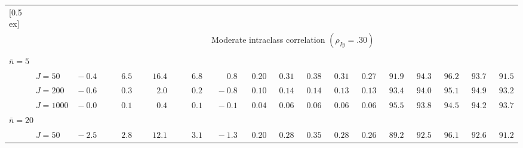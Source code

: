 \begin{sidewaystable}
\begin{threeparttable}
\begin{tabular}{llccccccccccccccc}
[0.5ex]\hline\\[-1.6ex] 
& & \multicolumn{15}{c}{Moderate intraclass correlation $(\rho_{Iy}=.30)$} \\[0.6ex]\hline\\[-1.8ex]
\multicolumn{4}{l}{$\bar{n}=5$} \\  & \nopagebreak $\;J=50$  & $\phantom{0}{-}0.4\phantom{0}$ & $\phantom{0}\phantom{-}6.5\phantom{0}$ & $\phantom{-}16.4\phantom{0}$ & $\phantom{0}\phantom{-}6.8\phantom{0}$ & $\phantom{0}\phantom{-}0.8\phantom{0}$ & $\phantom{0}0.20\phantom{0}$ & $\phantom{0}0.31\phantom{0}$ & $\phantom{0}0.38\phantom{0}$ & $\phantom{0}0.31\phantom{0}$ & $\phantom{0}0.27\phantom{0}$ & $\phantom{0}91.9\phantom{0}$ & $\phantom{0}94.3\phantom{0}$ & $\phantom{0}96.2\phantom{0}$ & $\phantom{0}93.7\phantom{0}$ & $\phantom{0}91.5\phantom{0}$ \\
 & \nopagebreak $\;J=200$  & $\phantom{0}{-}0.6\phantom{0}$ & $\phantom{0}\phantom{-}0.3\phantom{0}$ & $\phantom{0}\phantom{-}2.0\phantom{0}$ & $\phantom{0}\phantom{-}0.2\phantom{0}$ & $\phantom{0}{-}0.8\phantom{0}$ & $\phantom{0}0.10\phantom{0}$ & $\phantom{0}0.14\phantom{0}$ & $\phantom{0}0.14\phantom{0}$ & $\phantom{0}0.13\phantom{0}$ & $\phantom{0}0.13\phantom{0}$ & $\phantom{0}93.4\phantom{0}$ & $\phantom{0}94.0\phantom{0}$ & $\phantom{0}95.1\phantom{0}$ & $\phantom{0}94.9\phantom{0}$ & $\phantom{0}93.2\phantom{0}$ \\
 & \nopagebreak $\;J=1000$  & $\phantom{0}{-}0.0\phantom{0}$ & $\phantom{0}\phantom{-}0.1\phantom{0}$ & $\phantom{0}\phantom{-}0.4\phantom{0}$ & $\phantom{0}\phantom{-}0.1\phantom{0}$ & $\phantom{0}{-}0.1\phantom{0}$ & $\phantom{0}0.04\phantom{0}$ & $\phantom{0}0.06\phantom{0}$ & $\phantom{0}0.06\phantom{0}$ & $\phantom{0}0.06\phantom{0}$ & $\phantom{0}0.06\phantom{0}$ & $\phantom{0}95.5\phantom{0}$ & $\phantom{0}93.8\phantom{0}$ & $\phantom{0}94.5\phantom{0}$ & $\phantom{0}94.2\phantom{0}$ & $\phantom{0}93.7\phantom{0}$ \\
\multicolumn{4}{l}{$\bar{n}=20$} \\  & \nopagebreak $\;J=50$  & $\phantom{0}{-}2.5\phantom{0}$ & $\phantom{0}\phantom{-}2.8\phantom{0}$ & $\phantom{-}12.1\phantom{0}$ & $\phantom{0}\phantom{-}3.1\phantom{0}$ & $\phantom{0}{-}1.3\phantom{0}$ & $\phantom{0}0.20\phantom{0}$ & $\phantom{0}0.28\phantom{0}$ & $\phantom{0}0.35\phantom{0}$ & $\phantom{0}0.28\phantom{0}$ & $\phantom{0}0.26\phantom{0}$ & $\phantom{0}89.2\phantom{0}$ & $\phantom{0}92.5\phantom{0}$ & $\phantom{0}96.1\phantom{0}$ & $\phantom{0}92.6\phantom{0}$ & $\phantom{0}91.2\phantom{0}$ \\

\end{tabular}
\end{threeparttable}
\end{sidewaystable}
